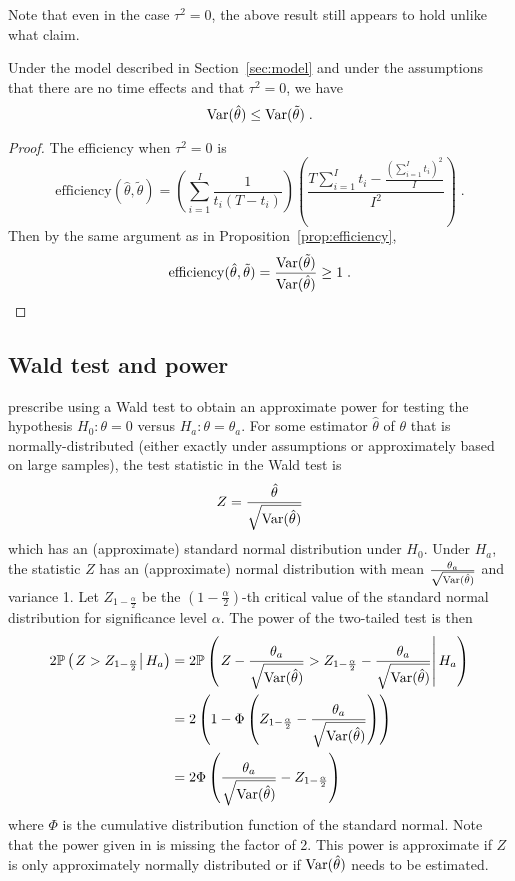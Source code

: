 \documentclass[10pt]{article}
\begin{document}
Note that even in the case $\tau^2=0$, the above result still appears to hold unlike what \textcite{Hussey:2007} claim.

\begin{corollary}
Under the model described in Section~\ref{sec:model} and under the assumptions that there are no time effects and that $\tau^2=0$, we have
\[
\mathrm{Var}(\hat{\theta}) \leq \mathrm{Var}(\tilde{\theta}) \;.
\]
\end{corollary}
\begin{proof}
The efficiency when $\tau^2=0$ is
\[
\mathrm{efficiency}(\hat{\theta},\tilde{\theta}) = \left(\sum_{i=1}^I\frac{1}{t_i(T-t_i)}\right)\left(\frac{T\sum_{i=1}^It_i-\frac{\left(\sum_{i=1}^It_i\right)^2}{I}}{I^2}\right) \;.
\]
Then by the same argument as in Proposition~\ref{prop:efficiency},
\[
\mathrm{efficiency}(\hat{\theta},\tilde{\theta}) = \frac{\mathrm{Var}(\tilde{\theta})}{\mathrm{Var}(\hat{\theta})} \geq 1 \;.
\]
\end{proof}


\subsection{Wald test and power} \label{apx:wald}

\textcite{Hussey:2007} prescribe using a Wald test to obtain an approximate power for testing the hypothesis $H_0:\theta=0$ versus $H_a:\theta=\theta_a$. For some estimator $\hat{\theta}$ of $\theta$ that is normally-distributed (either exactly under assumptions or approximately based on large samples), the test statistic in the Wald test is
\[
Z = \frac{\hat{\theta}}{\sqrt{\mathrm{Var}(\hat{\theta})}}
\]
which has an (approximate) standard normal distribution under $H_0$. Under $H_a$, the statistic $Z$ has an (approximate) normal distribution with mean $\frac{\theta_a}{\sqrt{\mathrm{Var}(\hat{\theta})}}$ and variance 1. Let $Z_{1-\frac{\alpha}{2}}$ be the $\left(1-\frac{\alpha}{2}\right)$-th critical value of the standard normal distribution for significance level $\alpha$. The power of the two-tailed test is then
\begin{align*}
2\mathbb{P}\left(\left.Z>Z_{1-\frac{\alpha}{2}}\right|H_a\right) &= 2\mathbb{P}\left(\left.Z-\frac{\theta_a}{\sqrt{\mathrm{Var}(\hat{\theta})}}>Z_{1-\frac{\alpha}{2}}-\frac{\theta_a}{\sqrt{\mathrm{Var}(\hat{\theta})}}\right|H_a\right) \\
&= 2\left(1-\Phi\left(Z_{1-\frac{\alpha}{2}}-\frac{\theta_a}{\sqrt{\mathrm{Var}(\hat{\theta})}}\right)\right) \\
&= 2\Phi\left(\frac{\theta_a}{\sqrt{\mathrm{Var}(\hat{\theta})}}-Z_{1-\frac{\alpha}{2}}\right)
\end{align*}
where $\Phi$ is the cumulative distribution function of the standard normal. Note that the power given in \textcite{Hussey:2007} is missing the factor of 2. This power is approximate if $Z$ is only approximately normally distributed or if $\mathrm{Var}(\hat{\theta})$ needs to be estimated.
\end{document}
